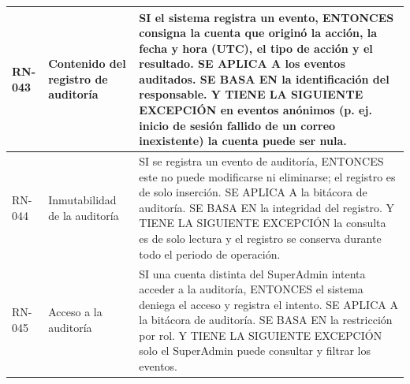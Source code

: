 \begin{longtable}{|C{1.4cm}|L{4.0cm}|L{9.4cm}|}
\hline
RN-043 & Contenido del registro de auditoría & SI el sistema registra un evento, ENTONCES consigna la cuenta que originó la acción, la fecha y hora (UTC), el tipo de acción y el resultado. SE APLICA A los eventos auditados. SE BASA EN la identificación del responsable. Y TIENE LA SIGUIENTE EXCEPCIÓN en eventos anónimos (p. ej. inicio de sesión fallido de un correo inexistente) la cuenta puede ser nula. \\
\hline
RN-044 & Inmutabilidad de la auditoría & SI se registra un evento de auditoría, ENTONCES este no puede modificarse ni eliminarse; el registro es de solo inserción. SE APLICA A la bitácora de auditoría. SE BASA EN la integridad del registro. Y TIENE LA SIGUIENTE EXCEPCIÓN la consulta es de solo lectura y el registro se conserva durante todo el periodo de operación. \\
\hline
RN-045 & Acceso a la auditoría & SI una cuenta distinta del SuperAdmin intenta acceder a la auditoría, ENTONCES el sistema deniega el acceso y registra el intento. SE APLICA A la bitácora de auditoría. SE BASA EN la restricción por rol. Y TIENE LA SIGUIENTE EXCEPCIÓN solo el SuperAdmin puede consultar y filtrar los eventos. \\
\hline
\end{longtable}
